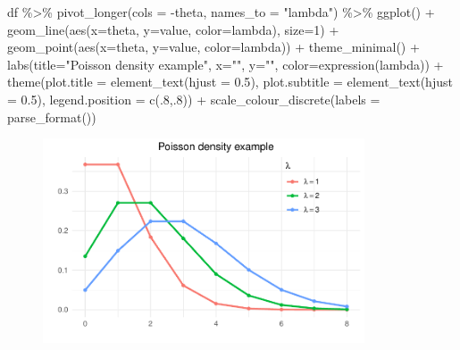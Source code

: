 \documentclass[
  letterpaper,
]{book}
\newenvironment{Shaded}{\begin{snugshade}}{\end{snugshade}}
\newcommand{\AttributeTok}[1]{\textcolor[rgb]{0.40,0.45,0.13}{#1}}
\newcommand{\DecValTok}[1]{\textcolor[rgb]{0.68,0.00,0.00}{#1}}
\newcommand{\FloatTok}[1]{\textcolor[rgb]{0.68,0.00,0.00}{#1}}
\newcommand{\FunctionTok}[1]{\textcolor[rgb]{0.28,0.35,0.67}{#1}}
\newcommand{\NormalTok}[1]{\textcolor[rgb]{0.00,0.23,0.31}{#1}}
\newcommand{\SpecialCharTok}[1]{\textcolor[rgb]{0.37,0.37,0.37}{#1}}
\newcommand{\StringTok}[1]{\textcolor[rgb]{0.13,0.47,0.30}{#1}}
\begin{document}
\begin{Shaded}
\begin{Highlighting}[]
\NormalTok{df }\SpecialCharTok{\%\textgreater{}\%}
  \FunctionTok{pivot\_longer}\NormalTok{(}\AttributeTok{cols =} \SpecialCharTok{{-}}\NormalTok{theta, }\AttributeTok{names\_to =} \StringTok{"lambda"}\NormalTok{) }\SpecialCharTok{\%\textgreater{}\%}
  \FunctionTok{ggplot}\NormalTok{() }\SpecialCharTok{+}
  \FunctionTok{geom\_line}\NormalTok{(}\FunctionTok{aes}\NormalTok{(}\AttributeTok{x=}\NormalTok{theta, }\AttributeTok{y=}\NormalTok{value, }\AttributeTok{color=}\NormalTok{lambda), }\AttributeTok{size=}\DecValTok{1}\NormalTok{) }\SpecialCharTok{+}
  \FunctionTok{geom\_point}\NormalTok{(}\FunctionTok{aes}\NormalTok{(}\AttributeTok{x=}\NormalTok{theta, }\AttributeTok{y=}\NormalTok{value, }\AttributeTok{color=}\NormalTok{lambda)) }\SpecialCharTok{+}
  \FunctionTok{theme\_minimal}\NormalTok{() }\SpecialCharTok{+}
  \FunctionTok{labs}\NormalTok{(}\AttributeTok{title=}\StringTok{"Poisson density example"}\NormalTok{, }\AttributeTok{x=}\StringTok{""}\NormalTok{, }\AttributeTok{y=}\StringTok{""}\NormalTok{,}
       \AttributeTok{color=}\FunctionTok{expression}\NormalTok{(lambda)) }\SpecialCharTok{+}
  \FunctionTok{theme}\NormalTok{(}\AttributeTok{plot.title =} \FunctionTok{element\_text}\NormalTok{(}\AttributeTok{hjust =} \FloatTok{0.5}\NormalTok{),}
        \AttributeTok{plot.subtitle =} \FunctionTok{element\_text}\NormalTok{(}\AttributeTok{hjust =} \FloatTok{0.5}\NormalTok{),}
        \AttributeTok{legend.position =} \FunctionTok{c}\NormalTok{(.}\DecValTok{8}\NormalTok{,.}\DecValTok{8}\NormalTok{)) }\SpecialCharTok{+}
  \FunctionTok{scale\_colour\_discrete}\NormalTok{(}\AttributeTok{labels =} \FunctionTok{parse\_format}\NormalTok{())}
\end{Highlighting}
\end{Shaded}

\begin{figure}[H]

{\centering \includegraphics[width=0.85\textwidth,height=\textheight]{CK_files/figure-pdf/ests-2.pdf}

}

\end{figure}
\end{document}
